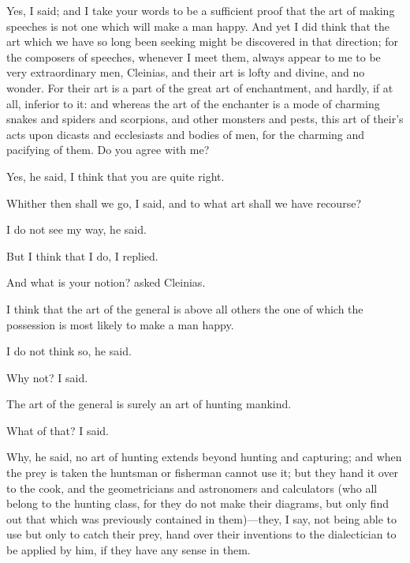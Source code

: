 \documentclass[11pt,letter]{article}
\begin{document}
\par  Yes, I said; and I take your words to be a sufficient proof that the art of making speeches is not one which will make a man happy. And yet I did think that the art which we have so long been seeking might be discovered in that direction; for the composers of speeches, whenever I meet them, always appear to me to be very extraordinary men, Cleinias, and their art is lofty and divine, and no wonder. For their art is a part of the great art of enchantment, and hardly, if at all, inferior to it: and whereas the art of the enchanter is a mode of charming snakes and spiders and scorpions, and other monsters and pests, this art of their's acts upon dicasts and ecclesiasts and bodies of men, for the charming and pacifying of them. Do you agree with me?

\par  Yes, he said, I think that you are quite right.

\par  Whither then shall we go, I said, and to what art shall we have recourse?

\par  I do not see my way, he said.

\par  But I think that I do, I replied.

\par  And what is your notion? asked Cleinias.

\par  I think that the art of the general is above all others the one of which the possession is most likely to make a man happy.

\par  I do not think so, he said.

\par  Why not? I said.

\par  The art of the general is surely an art of hunting mankind.

\par  What of that? I said.

\par  Why, he said, no art of hunting extends beyond hunting and capturing; and when the prey is taken the huntsman or fisherman cannot use it; but they hand it over to the cook, and the geometricians and astronomers and calculators (who all belong to the hunting class, for they do not make their diagrams, but only find out that which was previously contained in them)—they, I say, not being able to use but only to catch their prey, hand over their inventions to the dialectician to be applied by him, if they have any sense in them.
\end{document}

